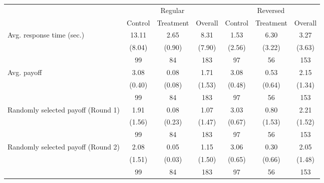 {
\def\sym#1{\ifmmode^{#1}\else\(^{#1}\)\fi}
\begin{tabular}{l*{6}{c}}
\toprule
          &\multicolumn{3}{c}{Regular}  &\multicolumn{3}{c}{Reversed} \\\cmidrule(lr){2-4}\cmidrule(lr){5-7}
          &\multicolumn{1}{c}{Control}&\multicolumn{1}{c}{Treatment}&\multicolumn{1}{c}{Overall}&\multicolumn{1}{c}{Control}&\multicolumn{1}{c}{Treatment}&\multicolumn{1}{c}{Overall}\\
\midrule
Avg. response time (sec.)&    13.11&     2.65&     8.31&     1.53&     6.30&     3.27\\
          &   (8.04)&   (0.90)&   (7.90)&   (2.56)&   (3.22)&   (3.63)\\
          &       99&       84&      183&       97&       56&      153\\
Avg. payoff&     3.08&     0.08&     1.71&     3.08&     0.53&     2.15\\
          &   (0.40)&   (0.08)&   (1.53)&   (0.48)&   (0.64)&   (1.34)\\
          &       99&       84&      183&       97&       56&      153\\
Randomly selected payoff (Round 1)&     1.91&     0.08&     1.07&     3.03&     0.80&     2.21\\
          &   (1.56)&   (0.23)&   (1.47)&   (0.67)&   (1.53)&   (1.52)\\
          &       99&       84&      183&       97&       56&      153\\
Randomly selected payoff (Round 2)&     2.08&     0.05&     1.15&     3.06&     0.30&     2.05\\
          &   (1.51)&   (0.03)&   (1.50)&   (0.65)&   (0.66)&   (1.48)\\
          &       99&       84&      183&       97&       56&      153\\
\bottomrule
\end{tabular}
}
